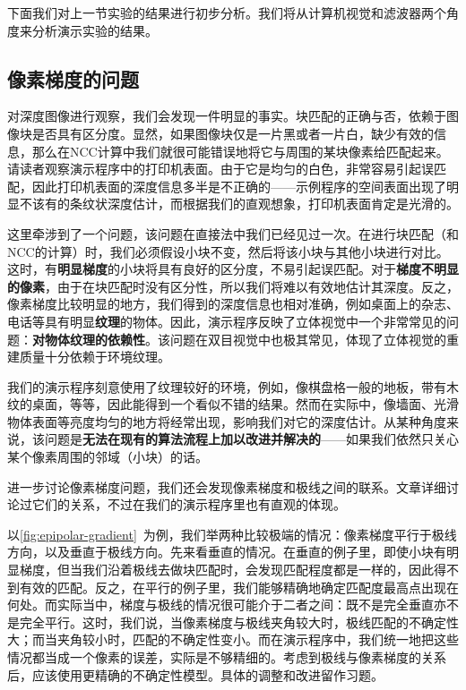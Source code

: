 下面我们对上一节实验的结果进行初步分析。我们将从计算机视觉和滤波器两个角度来分析演示实验的结果。

\subsection{像素梯度的问题}
对深度图像进行观察，我们会发现一件明显的事实。块匹配的正确与否，依赖于图像块是否具有区分度。显然，如果图像块仅是一片黑或者一片白，缺少有效的信息，那么在NCC计算中我们就很可能错误地将它与周围的某块像素给匹配起来。请读者观察演示程序中的打印机表面。由于它是均匀的白色，非常容易引起误匹配，因此打印机表面的深度信息多半是不正确的——示例程序的空间表面出现了明显不该有的条纹状深度估计，而根据我们的直观想象，打印机表面肯定是光滑的。

这里牵涉到了一个问题，该问题在直接法中我们已经见过一次。在进行块匹配（和NCC的计算）时，我们必须假设小块不变，然后将该小块与其他小块进行对比。这时，有\textbf{明显梯度}的小块将具有良好的区分度，不易引起误匹配。对于\textbf{梯度不明显的像素}，由于在块匹配时没有区分性，所以我们将难以有效地估计其深度。反之，像素梯度比较明显的地方，我们得到的深度信息也相对准确，例如桌面上的杂志、电话等具有明显\textbf{纹理}的物体。因此，演示程序反映了立体视觉中一个非常常见的问题：\textbf{对物体纹理的依赖性}。该问题在双目视觉中也极其常见，体现了立体视觉的重建质量十分依赖于环境纹理。

我们的演示程序刻意使用了纹理较好的环境，例如，像棋盘格一般的地板，带有木纹的桌面，等等，因此能得到一个看似不错的结果。然而在实际中，像墙面、光滑物体表面等亮度均匀的地方将经常出现，影响我们对它的深度估计。从某种角度来说，该问题是\textbf{无法在现有的算法流程上加以改进并解决的}——如果我们依然只关心某个像素周围的邻域（小块）的话。

进一步讨论像素梯度问题，我们还会发现像素梯度和极线之间的联系。文章\cite{Engel2013}详细讨论过它们的关系，不过在我们的演示程序里也有直观的体现。

以\autoref{fig:epipolar-gradient}~为例，我们举两种比较极端的情况：像素梯度平行于极线方向，以及垂直于极线方向。先来看垂直的情况。在垂直的例子里，即使小块有明显梯度，但当我们沿着极线去做块匹配时，会发现匹配程度都是一样的，因此得不到有效的匹配。反之，在平行的例子里，我们能够精确地确定匹配度最高点出现在何处。而实际当中，梯度与极线的情况很可能介于二者之间：既不是完全垂直亦不是完全平行。这时，我们说，当像素梯度与极线夹角较大时，极线匹配的不确定性大；而当夹角较小时，匹配的不确定性变小。而在演示程序中，我们统一地把这些情况都当成一个像素的误差，实际是不够精细的。考虑到极线与像素梯度的关系后，应该使用更精确的不确定性模型。具体的调整和改进留作习题。


